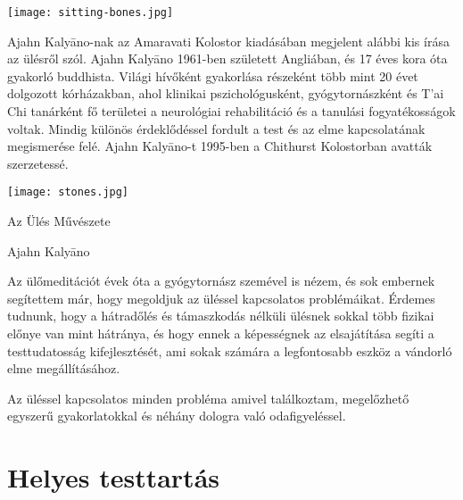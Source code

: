 \documentclass[10pt,oneside,landscape,final]{memoir}
\begin{document}
\newlength{\foldmarkhoriz}
\setlength{\foldmarkhoriz}{\stockwidth}
\addtolength{\foldmarkhoriz}{-0.5pt}

\AddToShipoutPicture{%
\put(\LenToUnit{\foldmarkhoriz},\LenToUnit{0pt}){%
\color[gray]{0.5}\rule{1pt}{5mm}%
}%
\put(\LenToUnit{\foldmarkhoriz},\LenToUnit{205mm}){%
\color[gray]{0.5}\rule{1pt}{5mm}%
}%
}

\pagestyle{empty}
\setlength{\parindent}{0pt}
\setlength{\parskip}{0.6\baselineskip}

{\centering\par
\texttt{[image: sitting-bones.jpg]}
\par}

\clearpage

Ajahn Kalyāno-nak az Amaravati Kolostor kiadásában megjelent alábbi kis írása az
ülésről szól. Ajahn Kalyāno 1961-ben született Angliában, és 17 éves kora óta
gyakorló buddhista. Világi hívőként gyakorlása részeként több mint 20 évet
dolgozott kórházakban, ahol klinikai pszichológusként, gyógytornászként és T’ai
Chi tanárként fő területei a neurológiai rehabilitáció és a tanulási
fogyatékosságok voltak. Mindig különös érdeklődéssel fordult a test és az elme
kapcsolatának megismerése felé. Ajahn Kalyāno-t 1995-ben a Chithurst Kolostorban
avatták szerzetessé.

\clearpage

{\centering\par
\texttt{[image: stones.jpg]}
\par}

{\centering\par
{\large Az Ülés Művészete}

Ajahn Kalyāno
\par}

\clearpage

Az ülőmeditációt évek óta a gyógytornász szemével is nézem, és sok embernek
segítettem már, hogy megoldjuk az üléssel kapcsolatos problémáikat. Érdemes
tudnunk, hogy a hátradőlés és támaszkodás nélküli ülésnek sokkal több fizikai
előnye van mint hátránya, és hogy ennek a képességnek az elsajátítása segíti a
testtudatosság kifejlesztését, ami sokak számára a legfontosabb eszköz a
vándorló elme megállításához.

Az üléssel kapcsolatos minden probléma amivel találkoztam, megelőzhető egyszerű
gyakorlatokkal és néhány dologra való odafigyeléssel.

\section{Helyes testtartás}
\end{document}
